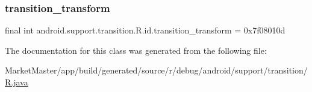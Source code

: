 \mbox{\label{classandroid_1_1support_1_1transition_1_1R_1_1id_a262eee6539d89b6200234e0c27e5d384}} 
\subsubsection{\texorpdfstring{transition\+\_\+transform}{transition\_transform}}
{\footnotesize\ttfamily final int android.\+support.\+transition.\+R.\+id.\+transition\+\_\+transform = 0x7f08010d\hspace{0.3cm}{\ttfamily [static]}}



The documentation for this class was generated from the following file\+:\begin{DoxyCompactItemize}
\item 
Market\+Master/app/build/generated/source/r/debug/android/support/transition/\mbox{\hyperlink{debug_2android_2support_2transition_2R_8java}{R.\+java}}\end{DoxyCompactItemize}
